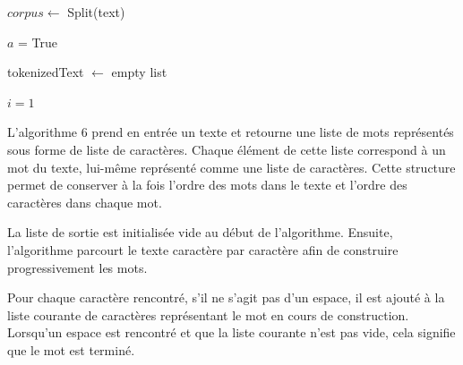 \documentclass[12pt,a4paper]{report}
\begin{document}
\begin{algorithm}[H]
	\caption{Tokenize}
	
	$corpus \leftarrow$ Split(text)\;
	
	$a$ = True\;
	
	tokenizedText $\leftarrow$ empty list\;
	
		
	$i = 1$\;
	
	
	
\end{algorithm}

\vspace{0.5 cm}

L’algorithme 6 prend en entrée un texte et retourne une liste de mots représentés sous forme de liste de caractères. Chaque élément de cette liste correspond à un mot du texte, lui-même représenté comme une liste de caractères. Cette structure permet de conserver à la fois l’ordre des mots dans le texte et l’ordre des caractères dans chaque mot.

La liste de sortie est initialisée vide au début de l’algorithme. Ensuite, l’algorithme parcourt le texte caractère par caractère afin de construire progressivement les mots.

Pour chaque caractère rencontré, s’il ne s’agit pas d’un espace, il est ajouté à la liste courante de caractères représentant le mot en cours de construction. Lorsqu’un espace est rencontré et que la liste courante n’est pas vide, cela signifie que le mot est terminé.
\end{document}
